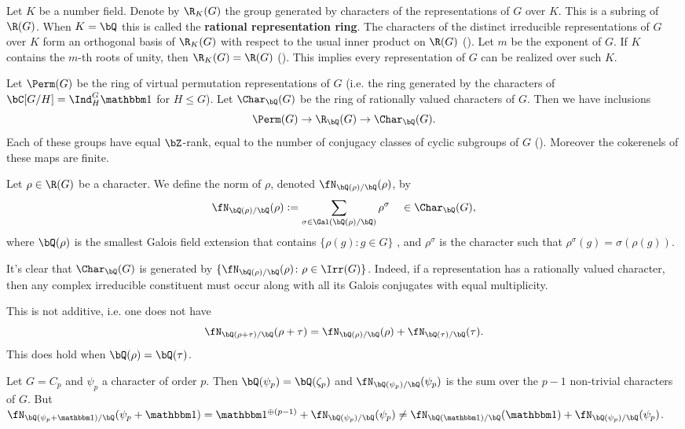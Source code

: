 Let $K$ be a number field. Denote by $\R_K(G)$ the group generated by characters of the representations of $G$ over $K$. This is a subring of $\R(G)$.
When $K = \bQ$ this is called the \textbf{rational representation ring}.
The characters of the distinct irreducible representations of $G$ over $K$ form an orthogonal basis of $\R_K(G)$ with respect to the usual inner product on $\R(G)$ (\cite[Proposition 32]{Serre}).
Let $m$ be the exponent of $G$. If $K$ contains the $m$-th roots of unity, then $\R_K(G) = \R(G)$ (\cite[Theorem 24]{Serre}). This implies every representation of $G$ can be realized over such $K$. 
\vspace{1em}

Let $\Perm(G)$ be the ring of virtual permutation representations of $G$ (i.e. the ring generated by the characters of $\bC[G / H] = \Ind_{H}^G \trivial$ for $H \leq G$). Let $\Char_{\bQ}(G)$ be the ring of rationally valued characters of $G$. Then we have inclusions 
\[ \Perm(G) \to \R_{\bQ}(G) \to \Char_{\bQ}(G). \]
Each of these groups have equal $\bZ$-rank, equal to the number of conjugacy classes of cyclic subgroups of $G$ (\cite[Chapter 13, \S13.1]{Serre}). Moreover the cokerenels of these maps are finite.

\begin{defn}\label{rho-norm}
    Let $\rho \in \R(G)$ be a character. We define the norm of $\rho$, denoted $\repnorm{\rho}$, by 
    \[
    \repnorm{\rho} \defeq \sum_{\sigma \in \Gal(\bQ(\rho)/\bQ)}  \rho^\sigma \quad \in \Char_{\bQ}(G),
    \]
    where $\bQ(\rho)$ is the smallest Galois field extension that contains $ \{\rho(g) \colon g \in G \}$ , and $\rho^\sigma$ is the character such that $\rho^\sigma(g) = \sigma(\rho(g))$.
\end{defn}

It's clear that $\Char_{\bQ}(G)$ is generated by $\{ \repnorm{\rho} \colon \rho \in \Irr(G) \}$. Indeed, if a representation has a rationally valued character, then any complex irreducible constituent must occur along with all its Galois conjugates with equal multiplicity.

\begin{rem}
This is not additive, i.e. one does not have \[\repnorm{\rho + \tau} = \repnorm{\rho} + \repnorm{\tau}. \] 
This does hold when $\bQ(\rho) = \bQ(\tau)$. 
\end{rem}

\begin{example}
    Let $G = C_p$ and $\psi_p$ a character of order $p$. Then $\bQ(\psi_p) = \bQ(\zeta_p)$ and $\repnorm{\psi_p}$ is the sum over the $p - 1$ non-trivial characters of $G$. But $\repnorm{\psi_p + \trivial} = \trivial^{\oplus (p - 1)} + \repnorm{\psi_p} \not= \repnorm{\trivial} + \repnorm{\psi_p}$.
\end{example}

